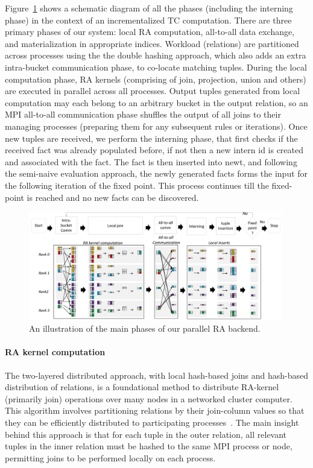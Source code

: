 Figure~\ref{fig:sid} shows a schematic diagram of all the phases (including the interning phase) in the context of an incrementalized TC computation. There are three primary phases of our system: local RA computation, all-to-all data exchange, and materialization in appropriate indices. Workload (relations) are partitioned across processes using the the double hashing approach, which also adds an extra intra-bucket communication phase, to co-locate matching tuples. During the local computation phase, RA kernels (comprising of join, projection, union and others) are executed in parallel across all processes. Output tuples generated from local computation may each belong to an arbitrary bucket in the output relation, so an MPI all-to-all communication phase shuffles the output of all joins to their managing processes (preparing them for any subsequent rules or iterations). Once new tuples are received, we perform the interning phase, that first checks if the received fact was already populated before, if not then a new intern id is created and associated with the fact. The fact is then inserted into newt, and following the semi-naive evaluation approach, the newly generated facts forms the input for the following iteration of the fixed point. This process continues till the fixed-point is reached and no new facts can be discovered.

\begin{figure}[t]
\includegraphics[width=0.99\textwidth]{fig/ra.pdf}
\caption{An illustration of the main phases of our parallel RA backend.}
\label{fig:sid}
\end{figure}

\paragraph*{RA kernel computation}
The two-layered distributed approach, with local hash-based joins and hash-based distribution of relations, is a foundational method to distribute RA-kernel (primarily join) operations over many nodes in a networked cluster computer. This algorithm involves partitioning relations by their join-column values so that they can be efficiently distributed to participating processes~\cite{Valduriez:1988:PET:54616.54618}. The main insight behind this approach is that for each tuple in the outer relation, all relevant tuples in the inner relation must be hashed to the same MPI process or node, permitting joins to be performed locally on each process.

